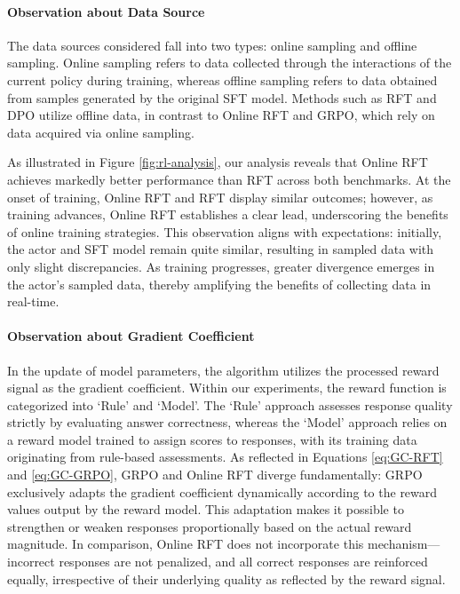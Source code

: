\begin{itemize}[topsep=0pt]
\begin{itemize}[topsep=0pt]
\paragraph{Observation about Data Source} The data sources considered fall into two types: online sampling and offline sampling. Online sampling refers to data collected through the interactions of the current policy during training, whereas offline sampling refers to data obtained from samples generated by the original SFT model. Methods such as RFT and DPO utilize offline data, in contrast to Online RFT and GRPO, which rely on data acquired via online sampling.

As illustrated in Figure \ref{fig:rl-analysis}, our analysis reveals that Online RFT achieves markedly better performance than RFT across both benchmarks. At the onset of training, Online RFT and RFT display similar outcomes; however, as training advances, Online RFT establishes a clear lead, underscoring the benefits of online training strategies. This observation aligns with expectations: initially, the actor and SFT model remain quite similar, resulting in sampled data with only slight discrepancies. As training progresses, greater divergence emerges in the actor’s sampled data, thereby amplifying the benefits of collecting data in real-time.

\paragraph{Observation about Gradient Coefficient} In the update of model parameters, the algorithm utilizes the processed reward signal as the gradient coefficient. Within our experiments, the reward function is categorized into `Rule' and `Model'. The `Rule' approach assesses response quality strictly by evaluating answer correctness, whereas the `Model' approach relies on a reward model trained to assign scores to responses, with its training data originating from rule-based assessments. As reflected in Equations \ref{eq:GC-RFT} and \ref{eq:GC-GRPO}, GRPO and Online RFT diverge fundamentally: GRPO exclusively adapts the gradient coefficient dynamically according to the reward values output by the reward model. This adaptation makes it possible to strengthen or weaken responses proportionally based on the actual reward magnitude. In comparison, Online RFT does not incorporate this mechanism—incorrect responses are not penalized, and all correct responses are reinforced equally, irrespective of their underlying quality as reflected by the reward signal.


\end{itemize}
\end{itemize}
